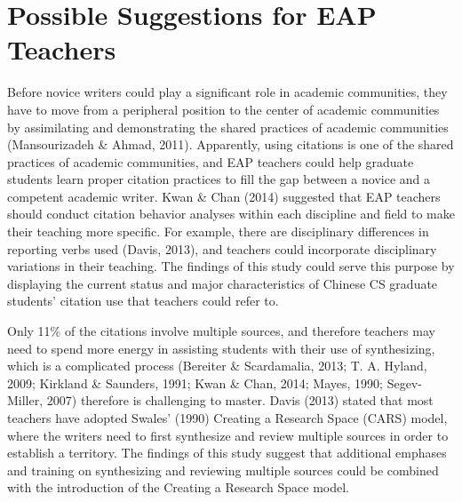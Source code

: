 \section{Possible Suggestions for EAP Teachers}

Before novice writers could play a significant role in academic communities, they have to move from a peripheral position to the center of academic communities by assimilating and demonstrating the shared practices of academic communities (Mansourizadeh \& Ahmad, 2011). Apparently, using citations is one of the shared practices of academic communities, and EAP teachers could help graduate students learn proper citation practices to fill the gap between a novice and a competent academic writer. Kwan \& Chan (2014) suggested that EAP teachers should conduct citation behavior analyses within each discipline and field to make their teaching more specific. For example, there are disciplinary differences in reporting verbs used (Davis, 2013), and teachers could incorporate disciplinary variations in their teaching. The findings of this study could serve this purpose by displaying the current status and major characteristics of Chinese CS graduate students’ citation use that teachers could refer to.

Only 11\% of the citations involve multiple sources, and therefore teachers may need to spend more energy in assisting students with their use of synthesizing, which is a complicated process (Bereiter \& Scardamalia, 2013; T. A. Hyland, 2009; Kirkland \& Saunders, 1991; Kwan \& Chan, 2014; Mayes, 1990; Segev-Miller, 2007) therefore is challenging to master. Davis (2013) stated that most teachers have adopted Swales’ (1990) Creating a Research Space (CARS) model, where the writers need to first synthesize and review multiple sources in order to establish a territory. The findings of this study suggest that additional emphases and training on synthesizing and reviewing multiple sources could be combined with the introduction of the Creating a Research Space model.


